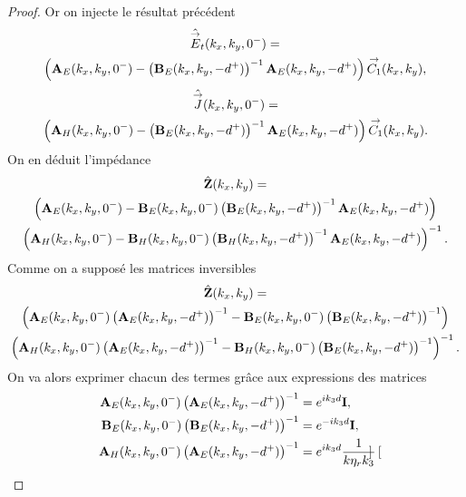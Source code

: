\begin{proof}
            Or on injecte le résultat précédent
            \begin{multline*}
                \hat {{\overset{\rightarrow}{E}}}_t(k_x,k_y,0^-) =
                \\
                \left(\mathbf{A}_E(k_x,k_y,0^-)-\left(\mathbf{B}_E(k_x,k_y,-d^+)\right)^{-1}\mathbf{A}_E(k_x,k_y,-d^+)\right){\overset{\rightarrow}{C_1}}(k_x,k_y),
            \end{multline*}
            \begin{multline*}
                \hat{{\overset{\rightarrow}{J}}}(k_x,k_y,0^-) =
                \\
                \left(\mathbf{A}_H(k_x,k_y,0^-)-\left(\mathbf{B}_E(k_x,k_y,-d^+)\right)^{-1}\mathbf{A}_E(k_x,k_y,-d^+)\right){\overset{\rightarrow}{C_1}}(k_x,k_y).
            \end{multline*}
            On en déduit l'impédance
            \begin{multline*}
                \hat {\mathbf{Z}}(k_x,k_y) =
                \\
                \left(\mathbf{A}_E(k_x,k_y,0^-)-\mathbf{B}_E(k_x,k_y,0^-)\left(\mathbf{B}_E(k_x,k_y,-d^+)\right)^{-1}\mathbf{A}_E(k_x,k_y,-d^+)\right)
                \\
                \left(\mathbf{A}_H(k_x,k_y,0^-)-\mathbf{B}_H(k_x,k_y,0^-)\left(\mathbf{B}_H(k_x,k_y,-d^+)\right)^{-1}\mathbf{A}_E(k_x,k_y,-d^+)\right)^{-1}.
            \end{multline*}
            Comme on a supposé les matrices inversibles
            \begin{multline*}
                \hat {\mathbf{Z}}(k_x,k_y) =
                \\ \left(\mathbf{A}_E(k_x,k_y,0^-)\left(\mathbf{A}_E(k_x,k_y,-d^+)\right)^{-1}-\mathbf{B}_E(k_x,k_y,0^-)\left(\mathbf{B}_E(k_x,k_y,-d^+)\right)^{-1}\right) 
                \\
                \left(\mathbf{A}_H(k_x,k_y,0^-)\left(\mathbf{A}_E(k_x,k_y,-d^+)\right)^{-1}-\mathbf{B}_H(k_x,k_y,0^-)\left(\mathbf{B}_E(k_x,k_y,-d^+)\right)^{-1}\right)^{-1}.
            \end{multline*}
            On va alors exprimer chacun des termes grâce aux expressions des matrices
            \begin{align*}
                \mathbf{A}_E(k_x,k_y,0^-)\left(\mathbf{A}_E(k_x,k_y,-d^+)\right)^{-1} &= e^{ik_3d}\mathbf{I},
                \\
                \mathbf{B}_E(k_x,k_y,0^-)\left(\mathbf{B}_E(k_x,k_y,-d^+)\right)^{-1} &= e^{-ik_3d}\mathbf{I},
                \\
                \mathbf{A}_H(k_x,k_y,0^-)\left(\mathbf{A}_E(k_x,k_y,-d^+)\right)^{-1} &= e^{ik_3d}\dfrac{1}{k\eta_r k_3}
                \begin{bmatrix}

\end{bmatrix}
\end{align*}
\end{proof}
